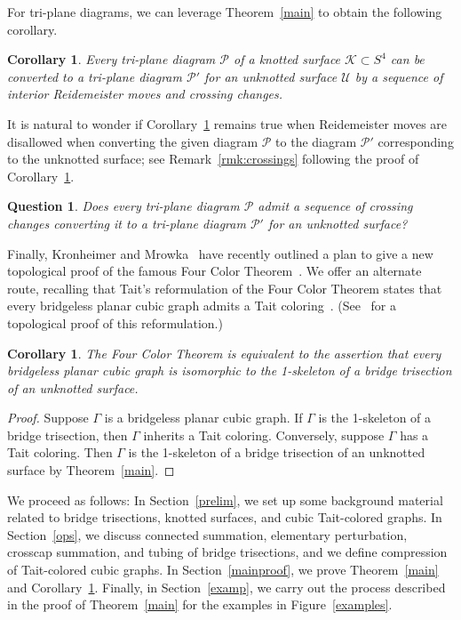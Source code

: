 \documentclass[11pt, oneside]{amsart}
\theoremstyle{theorem}
\newtheorem{question}[theorem]{Question}
\newtheorem{corollary}[theorem]{Corollary}
\theoremstyle{definition}
\newcommand{\Pau}{\mathcal{P}}
\theoremstyle{theorem}
\begin{document}
For tri-plane diagrams, we can leverage Theorem~\ref{main} to obtain the following corollary.

\begin{corollary}\label{changes}
	Every tri-plane diagram $\mathcal P$ of a knotted surface $\mathcal K \subset S^4$ can be converted to a tri-plane diagram $\mathcal P'$ for an unknotted surface $\mathcal U$ by a sequence of interior Reidemeister moves and crossing changes.
\end{corollary}

It is natural to wonder if Corollary~\ref{changes} remains true when Reidemeister moves are disallowed when converting the given diagram $\Pau$ to the diagram $\Pau'$ corresponding to the unknotted surface; see Remark~\ref{rmk:crossings} following the proof of Corollary~\ref{changes}.

\begin{question}
	Does every tri-plane diagram $\Pau$ admit a sequence of crossing changes converting it to a tri-plane diagram $\Pau'$ for an unknotted surface?
\end{question}


Finally, Kronheimer and Mrowka~\cite{KM} have recently outlined a plan to give a new topological proof of the famous Four Color Theorem~\cite{AH}.  We offer an alternate route, recalling that Tait's reformulation of the Four Color Theorem states that every bridgeless planar cubic graph admits a Tait coloring~\cite{Tait}. (See~\cite{Brown} for a topological proof of this reformulation.)

\begin{corollary}
The Four Color Theorem is equivalent to the assertion that every bridgeless planar cubic graph is isomorphic to the 1-skeleton of a bridge trisection of an unknotted surface.
\end{corollary}


\begin{proof}
	Suppose $\Gamma$ is a bridgeless planar cubic graph.  If $\Gamma$ is the 1-skeleton of a bridge trisection, then $\Gamma$ inherits a Tait coloring.  Conversely, suppose $\Gamma$ has a Tait coloring.  Then $\Gamma$ is the 1-skeleton of a bridge trisection of an unknotted surface by Theorem~\ref{main}.
\end{proof}


We proceed as follows:  In Section~\ref{prelim}, we set up some background material related to bridge trisections, knotted surfaces, and cubic Tait-colored graphs.  In Section~\ref{ops}, we discuss connected summation, elementary perturbation, crosscap summation, and tubing of bridge trisections, and we define compression of Tait-colored cubic graphs.  In Section~\ref{mainproof}, we prove Theorem~\ref{main} and Corollary~\ref{changes}.  Finally, in Section~\ref{examp}, we carry out the process described in the proof of Theorem~\ref{main} for the examples in Figure~\ref{examples}.
\end{document}
